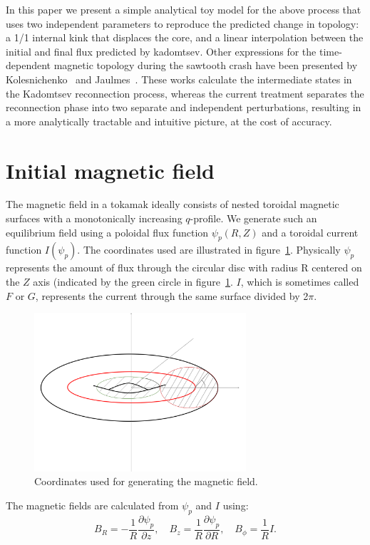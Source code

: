 \documentclass[%
superscriptaddress,
amsmath,amssymb,
aps,
pre,
floatfix,
]{revtex4-2}
\begin{document}
In this paper we present a simple analytical toy model for the above process that uses two independent parameters to reproduce the predicted change in topology: a 1/1 internal kink that displaces the core, and a linear interpolation between the initial and final flux predicted by kadomtsev.
Other expressions for the time-dependent magnetic topology during the sawtooth crash have been presented by Kolesnichenko~\cite{kolesnichenko1996theory} and Jaulmes~\cite{jaulmes2014redistribution}.
These works calculate the intermediate states in the Kadomtsev reconnection process, whereas the current treatment separates the reconnection phase into two separate and independent perturbations, resulting in a more analytically tractable and intuitive picture, at the cost of accuracy.

\section*{Initial magnetic field}
The magnetic field in a tokamak ideally consists of nested toroidal magnetic surfaces with a monotonically increasing $q$-profile.
We generate such an equilibrium field using a poloidal flux function $\psi_p(R, Z)$ and a toroidal current function $I(\psi_p)$.
The coordinates used are illustrated in figure~\ref{fig:coords}.
Physically $\psi_p$ represents the amount of flux through the circular disc with radius R centered on the $Z$ axis (indicated by the green circle in figure~\ref{fig:coords}.
$I$, which is sometimes called $F$ or $G$, represents the current through the same surface divided by 2$\pi$.
\begin{figure}\label{fig:coords}
  \includegraphics[width=0.7\textwidth]{fig/torus.png}
  \caption{Coordinates used for generating the magnetic field. }
\end{figure}

The magnetic fields are calculated from $\psi_p$ and $I$ using:
\begin{equation}\label{eq:unperturbed}
  B_R = -\frac{1}{R} \frac{\partial \psi_p}{\partial z}, \quad B_z= \frac{1}{R} \frac{\partial
  \psi_p}{\partial R}, \quad
  B_\phi = \frac{1}{R} I.
\end{equation}
\end{document}
